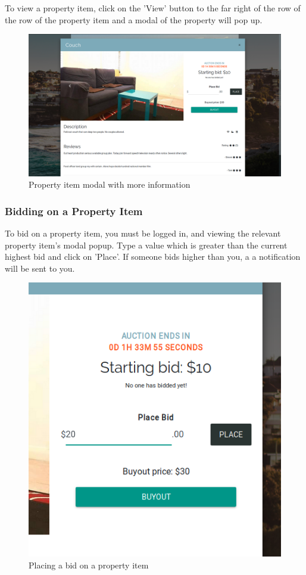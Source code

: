 To view a property item, click on the 'View' button to the far right of the row
of the row of the property item and a modal of the property will pop up.

\begin{figure}[!h]
  \includegraphics[width=\linewidth]{assets/userManual/propertyModal.png}
  \caption{Property item modal with more information}
  \label{fig:propertyModal}
\end{figure}

\subsubsection{Bidding on a Property Item}
To bid on a property item, you must be logged in, and viewing the relevant
property item's modal popup. Type a value which is greater than the current
highest bid and click on 'Place'. If someone bids higher than you, a
a notification will be sent to you.

\begin{figure}[!h]
  \includegraphics[width=\linewidth]{assets/userManual/biddingModule.png}
  \caption{Placing a bid on a property item}
  \label{fig:biddingModule}
\end{figure}

